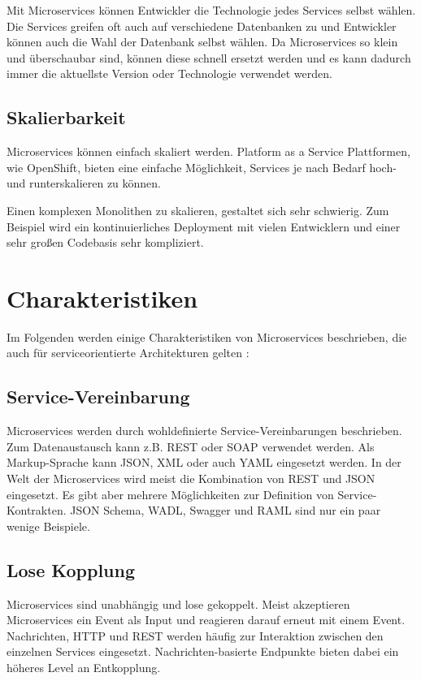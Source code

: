 Mit Microservices können Entwickler die Technologie jedes Services selbst wählen. Die Services greifen oft auch auf verschiedene Datenbanken zu und Entwickler können auch die Wahl der Datenbank selbst wählen. Da Microservices so klein und überschaubar sind, können diese schnell ersetzt werden und es kann dadurch immer die aktuellste Version oder Technologie verwendet werden.

\subsection{Skalierbarkeit}
Microservices können einfach skaliert werden. Platform as a Service Plattformen, wie OpenShift, bieten eine einfache Möglichkeit, Services je nach Bedarf hoch- und runterskalieren zu können.

Einen komplexen Monolithen zu skalieren, gestaltet sich sehr schwierig. Zum Beispiel wird ein kontinuierliches Deployment mit vielen Entwicklern und einer sehr großen Codebasis sehr kompliziert.


\section{Charakteristiken}
Im Folgenden werden einige Charakteristiken von Microservices beschrieben, die auch für serviceorientierte Architekturen gelten \cite{SpringMicroservices}:

\subsection{Service-Vereinbarung}
Microservices werden durch wohldefinierte Service-Vereinbarungen beschrieben. Zum Datenaustausch kann z.B. REST oder SOAP verwendet werden. Als Markup-Sprache kann JSON, XML oder auch YAML eingesetzt werden. In der Welt der Microservices wird meist die Kombination von REST und JSON eingesetzt. Es gibt aber mehrere Möglichkeiten zur Definition von Service-Kontrakten. JSON Schema, WADL, Swagger und RAML sind nur ein paar wenige Beispiele.

\subsection{Lose Kopplung}
Microservices sind unabhängig und lose gekoppelt. Meist akzeptieren Microservices ein Event als Input und reagieren darauf erneut mit einem Event. Nachrichten, HTTP und REST werden häufig zur Interaktion zwischen den einzelnen Services eingesetzt. Nachrichten-basierte Endpunkte bieten dabei ein höheres Level an Entkopplung.

